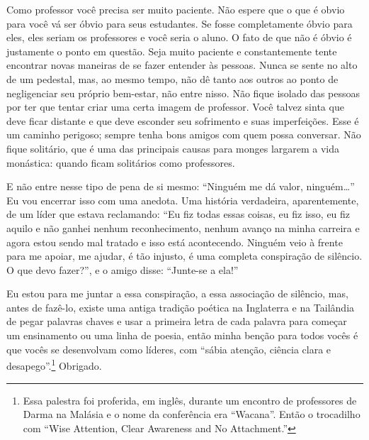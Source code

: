 Como professor você precisa ser muito paciente. Não espere que o que
é obvio para você vá ser óbvio para seus estudantes. Se fosse
completamente óbvio para eles, eles seriam os professores e você seria
o aluno. O fato de que não é óbvio é justamente o ponto em questão.
Seja muito paciente e constantemente tente encontrar novas maneiras de
se fazer entender às pessoas. Nunca se sente no alto de um pedestal,
mas, ao mesmo tempo, não dê tanto aos outros ao ponto de negligenciar
seu próprio bem-estar, não entre nisso. Não fique isolado das pessoas
por ter que tentar criar uma certa imagem de professor. Você talvez
sinta que deve ficar distante e que deve esconder seu sofrimento e suas
imperfeições. Esse é um caminho perigoso; sempre tenha bons amigos com
quem possa conversar. Não fique solitário, que é uma das principais
causas para monges largarem a vida monástica: quando ficam solitários
como professores. 

E não entre nesse tipo de pena de si mesmo: “Ninguém me dá valor,
ninguém…” Eu vou encerrar isso com uma anedota. Uma história
verdadeira, aparentemente, de um líder que estava reclamando: “Eu fiz
todas essas coisas, eu fiz isso, eu fiz aquilo e não ganhei nenhum
reconhecimento, nenhum avanço na minha carreira e agora estou sendo mal
tratado e isso está acontecendo. Ninguém veio à frente para me apoiar,
me ajudar, é tão injusto, é uma completa conspiração de silêncio. O que
devo fazer?”, e o amigo disse: “Junte-se a ela!” 

Eu estou para me juntar a essa conspiração, a essa associação de
silêncio, mas, antes de fazê-lo, existe uma antiga tradição poética na
Inglaterra e na Tailândia de pegar palavras chaves e usar a primeira
letra de cada palavra para começar um ensinamento ou uma linha de
poesia, então minha benção para todos vocês é que vocês se desenvolvam
como líderes, com “sábia atenção, ciência clara e
desapego”.\footnote{Essa palestra foi proferida, em inglês, durante um
encontro de professores de Darma na Malásia e o nome da conferência era
“Wacana”. Então o trocadilho com “Wise Attention, Clear Awareness and
No Attachment.”} Obrigado. 
